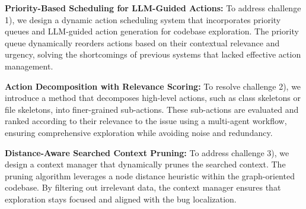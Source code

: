 \squishlist
\item \textbf{Priority-Based Scheduling for LLM-Guided Actions:} 
To address challenge 1), we design a dynamic action scheduling system that incorporates priority queues and LLM-guided action generation for codebase exploration. The priority queue dynamically reorders actions based on their contextual relevance and urgency, solving the shortcomings of previous systems that lacked effective action management.
\item \textbf{Action Decomposition with Relevance Scoring:} To resolve challenge 2), we introduce a method that decomposes high-level actions, such as class skeletons or file skeletons, into finer-grained sub-actions. These sub-actions are evaluated and ranked 
according to their relevance to the issue using a multi-agent workflow, ensuring comprehensive exploration while avoiding noise and redundancy.
\item \textbf{Distance-Aware Searched Context Pruning:} To address challenge 3), we design a context manager that 
dynamically prunes the searched context. The pruning algorithm leverages
a node distance heuristic within the graph-oriented codebase. By filtering out irrelevant data, the context manager ensures that exploration 
stays focused and aligned with the bug localization.
\squishend



